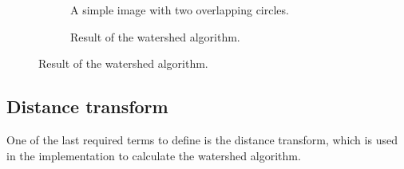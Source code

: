 \documentclass[
  digital,     %
  oneside,     %
  nosansbold,  %
  nocolorbold, %
  lof,         %
  lot,         %
]{fithesis4}
\begin{document}
\begin{figure}
    \begin{subfigure}[t]{0.48\textwidth}
        \caption{A simple image with two overlapping circles.}
    \end{subfigure}
    \begin{subfigure}[t]{0.48\textwidth}
        \caption{Result of the watershed algorithm.}
    \end{subfigure}
    \label{fig:demo-watershed}
\end{figure}

\subsection{Distance transform}

One of the last required terms to define is the distance transform, which is
used in the implementation to calculate the watershed algorithm.
\end{document}
